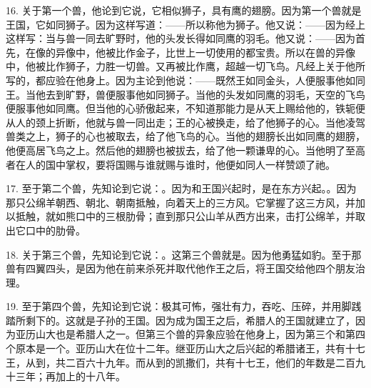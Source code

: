 16. 关于第一个兽，他论到它说，它相似狮子，具有鹰的翅膀。因为第一个兽就是王国，它如同狮子。因为这样写道：——所以称他为狮子。他又说：——因为经上这样写：当与兽一同去旷野时，他的头发长得如同鹰的羽毛。他又说：——因为首先，在像的异像中，他被比作金子，比世上一切使用的都宝贵。所以在兽的异像中，他被比作狮子，力胜一切兽。又再被比作鹰，超越一切飞鸟。凡经上关于他所写的，都应验在他身上。因为主论到他说：——既然王如同金头，人便服事他如同王。当他去到旷野，兽便服事他如同狮子。当他的头发如同鹰的羽毛，天空的飞鸟便服事他如同鹰。但当他的心骄傲起来，不知道那能力是从天上赐给他的，铁轭便从人的颈上折断，他就与兽一同出走；王的心被换走，给了他狮子的心。当他凌驾兽类之上，狮子的心也被取去，给了他飞鸟的心。当他的翅膀长出如同鹰的翅膀，他便高居飞鸟之上。然后他的翅膀也被拔去，给了他一颗谦卑的心。当他明了至高者在人的国中掌权，要将国赐与谁就赐与谁时，他便如同人一样赞颂了祂。\par

17. 至于第二个兽，先知论到它说：。因为和王国兴起时，是在东方兴起。。因为那只公绵羊朝西、朝北、朝南抵触，向着天上的三方风。它掌握了这三方风，并加以抵触，就如熊口中的三根肋骨；直到那只公山羊从西方出来，击打公绵羊，并取出它口中的肋骨。\par

18. 关于第三个兽，先知论到它说：。这第三个兽就是。因为他勇猛如豹。至于那兽有四翼四头，是因为他在前来杀死并取代他作王之后，将王国交给他四个朋友治理。\par

19. 至于第四个兽，先知论到它说：极其可怖，强壮有力，吞吃、压碎，并用脚践踏所剩下的。这就是子孙的王国。因为成为国王之后，希腊人的王国就建立了，因为亚历山大也是希腊人之一。但第三个兽的异象应验在他身上，因为第三个和第四个原本是一个。亚历山大在位十二年。继亚历山大之后兴起的希腊诸王，共有十七王，从到，共二百六十九年。而从到的凯撒们，共有十七王，他们的年数是二百九十三年；再加上的十八年。\par

